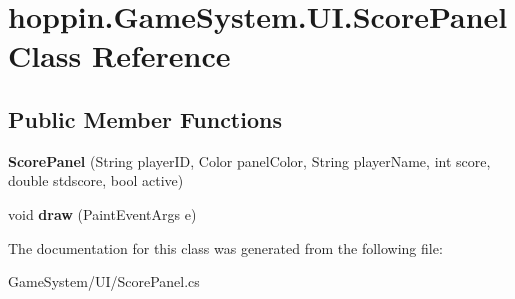 \hypertarget{classhoppin_1_1_game_system_1_1_u_i_1_1_score_panel}{}\section{hoppin.\+Game\+System.\+U\+I.\+Score\+Panel Class Reference}
\label{classhoppin_1_1_game_system_1_1_u_i_1_1_score_panel}
\subsection*{Public Member Functions}
\begin{DoxyCompactItemize}
\item 
{\bfseries Score\+Panel} (String player\+ID, Color panel\+Color, String player\+Name, int score, double stdscore, bool active)\hypertarget{classhoppin_1_1_game_system_1_1_u_i_1_1_score_panel_af6aa7d7777b5caed27cb65ff633485a2}{}\label{classhoppin_1_1_game_system_1_1_u_i_1_1_score_panel_af6aa7d7777b5caed27cb65ff633485a2}

\item 
void {\bfseries draw} (Paint\+Event\+Args e)\hypertarget{classhoppin_1_1_game_system_1_1_u_i_1_1_score_panel_a7a983d672c7042c5ea7641b5b737e0ad}{}\label{classhoppin_1_1_game_system_1_1_u_i_1_1_score_panel_a7a983d672c7042c5ea7641b5b737e0ad}

\end{DoxyCompactItemize}


The documentation for this class was generated from the following file\+:\begin{DoxyCompactItemize}
\item 
Game\+System/\+U\+I/Score\+Panel.\+cs\end{DoxyCompactItemize}
